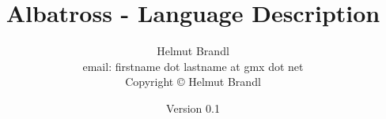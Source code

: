 \documentclass[10pt]{report}
\begin{document}
\title{Albatross - Language Description} \date{Version 0.1}
\author{Helmut Brandl \\
  {\scriptsize email: firstname dot lastname at gmx dot net} \\
  {\scriptsize Copyright {\copyright} Helmut Brandl}} 
\maketitle

\tableofcontents








\end{document}

